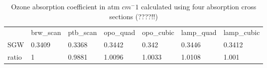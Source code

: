 \documentclass[acp, manuscript]{copernicus}
\begin{document}
\begin{table}[t]
\caption{Ozone absorption coefficient in atm $cm^-1$ calculated using  four absorption cross sections (????!!)}
\begin{tabular}{lllllll}
\tophline
     & brw\_scan & ptb\_scan & opo\_quad & opo\_cubic & lamp\_quad & lamp\_cubic \\
\middlehline
SGW   & 0.3409    & 0.3368    & 0.3442    & 0.342      & 0.3446     & 0.3412      \\
ratio & 1         & 0.9881    & 1.0096    & 1.0033     & 1.0108     & 1.001      
\bottomhline
\end{tabular}
\belowtable{} %
\label{tab:o3abs_sum}
\end{table}













\end{document}
